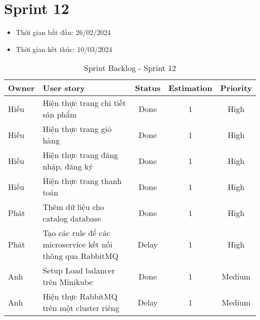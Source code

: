 \section{Sprint 12}
\begin{itemize}
    \item Thời gian bắt đầu: 26/02/2024
    \item Thời gian kết thúc: 10/03/2024
\end{itemize}
\begin{table}[H]
    \begin{tabular}{|m{2.5cm}|m{6cm}|c|c|c|}
    \hline
    \textbf{Owner}  & \textbf{User story}                                & \textbf{Status} & \textbf{Estimation} & \textbf{Priority} \\ \hline
    Hiếu               & Hiện thực trang chi tiết sản phẩm                    & Done            & 1                   & High         \\ \hline
    Hiếu              & Hiện thực trang giỏ hàng                     & Done            & 1                   & High         \\ \hline
    Hiếu               & Hiện thực trang đăng nhập, đăng ký                   & Done            & 1                   & High         \\ \hline
    Hiếu              & Hiện thực trang thanh toán                    & Done            & 1                   & High         \\ \hline
    Phát              & Thêm dữ liệu cho catalog database                     & Done            & 1                   & High         \\ \hline
    Phát              & Tạo các rule để các microservice kết nối thông qua RabbitMQ                     & Delay            & 1                   & High         \\ \hline
    Anh              & Setup Load balancer trên Minikube                    & Done            & 1                   & Medium         \\ \hline
    Anh              & Hiện thực RabbitMQ trên một cluster riêng                     & Delay            & 1                   & Medium         \\ \hline
    \end{tabular}
    \caption{Sprint Backlog - Sprint 12}
    \label{tab:sprint-12}
\end{table}
